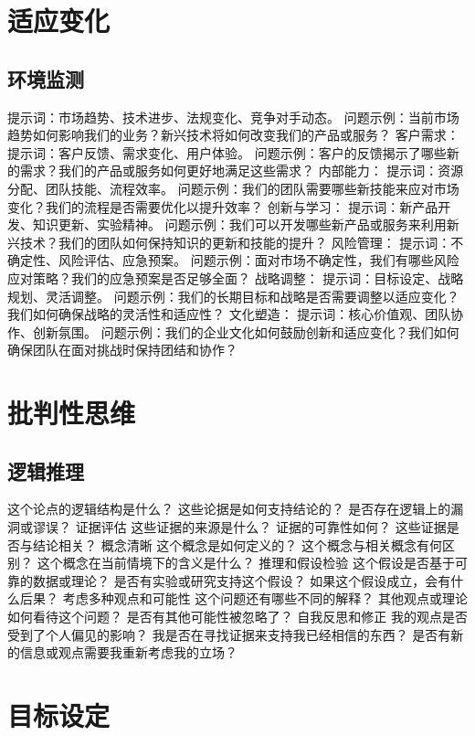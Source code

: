\documentclass[12pt]{book}
\begin{document}
\section{适应变化}
\subsection{环境监测}
提示词：市场趋势、技术进步、法规变化、竞争对手动态。
问题示例：当前市场趋势如何影响我们的业务？新兴技术将如何改变我们的产品或服务？
客户需求：
提示词：客户反馈、需求变化、用户体验。
问题示例：客户的反馈揭示了哪些新的需求？我们的产品或服务如何更好地满足这些需求？
内部能力：
提示词：资源分配、团队技能、流程效率。
问题示例：我们的团队需要哪些新技能来应对市场变化？我们的流程是否需要优化以提升效率？
创新与学习：
提示词：新产品开发、知识更新、实验精神。
问题示例：我们可以开发哪些新产品或服务来利用新兴技术？我们的团队如何保持知识的更新和技能的提升？
风险管理：
提示词：不确定性、风险评估、应急预案。
问题示例：面对市场不确定性，我们有哪些风险应对策略？我们的应急预案是否足够全面？
战略调整：
提示词：目标设定、战略规划、灵活调整。
问题示例：我们的长期目标和战略是否需要调整以适应变化？我们如何确保战略的灵活性和适应性？
文化塑造：
提示词：核心价值观、团队协作、创新氛围。
问题示例：我们的企业文化如何鼓励创新和适应变化？我们如何确保团队在面对挑战时保持团结和协作？


\section{批判性思维}
\subsection{逻辑推理}
这个论点的逻辑结构是什么？
这些论据是如何支持结论的？
是否存在逻辑上的漏洞或谬误？
证据评估
这些证据的来源是什么？
证据的可靠性如何？
这些证据是否与结论相关？
概念清晰
这个概念是如何定义的？
这个概念与相关概念有何区别？
这个概念在当前情境下的含义是什么？
推理和假设检验
这个假设是否基于可靠的数据或理论？
是否有实验或研究支持这个假设？
如果这个假设成立，会有什么后果？
考虑多种观点和可能性
这个问题还有哪些不同的解释？
其他观点或理论如何看待这个问题？
是否有其他可能性被忽略了？
自我反思和修正
我的观点是否受到了个人偏见的影响？
我是否在寻找证据来支持我已经相信的东西？
是否有新的信息或观点需要我重新考虑我的立场？

\section{目标设定}
\end{document}
